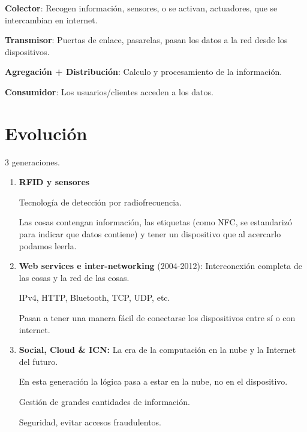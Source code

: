 \documentclass[12pt]{report} %
\begin{document}
\textbf{Colector}: Recogen información, sensores, o se activan,
actuadores, que se intercambian en internet.

\textbf{Transmisor}: Puertas de enlace, pasarelas, pasan los datos a la
red desde los dispositivos.

\textbf{Agregación + Distribución}: Calculo y procesamiento de la
información.

\textbf{Consumidor}: Los usuarios/clientes acceden a los datos.

\section{Evolución}

3 generaciones.

\begin{enumerate}
\def\labelenumi{\arabic{enumi}.}
\item
  \textbf{RFID y sensores}

  Tecnología de detección por radiofrecuencia.

  Las cosas contengan información, las etiquetas (como NFC, se
  estandarizó para indicar que datos contiene) y tener un dispositivo
  que al acercarlo podamos leerla.
\item
  \textbf{Web services e inter-networking} (2004-2012): Interconexión
  completa de las cosas y la red de las cosas.

  IPv4, HTTP, Bluetooth, TCP, UDP, etc.

  Pasan a tener una manera fácil de conectarse los dispositivos entre sí
  o con internet.
\item
  \textbf{Social, Cloud \& ICN:} La era de la computación en la nube y
  la Internet del futuro.

  En esta generación la lógica pasa a estar en la nube, no en el
  dispositivo.

  Gestión de grandes cantidades de información.

  Seguridad, evitar accesos fraudulentos.
\end{enumerate}
\end{document}
